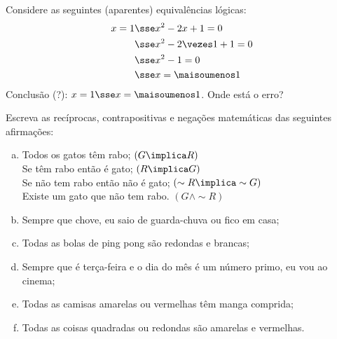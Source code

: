 \begin{exercise}
  Considere as seguintes (aparentes) equivalências lógicas:
  \begin{align*}
    x = 1 & \sse x^2 -2x +1 = 0         \\
          & \sse x^2 -2 \vezes 1 +1 = 0 \\
          & \sse x^2 - 1 = 0            \\
          & \sse x = \maisoumenos 1
  \end{align*}
  Conclusão (?): $x = 1 \sse x = \maisoumenos 1$. Onde está o erro?
\end{exercise}

\begin{exercise}
  \label{exe:escrever-reciprocas}
  Escreva as recíprocas, contrapositivas e negações matemáticas das seguintes afirmações:
  \begin{enumerate}[a)]
    \item Todos os gatos têm rabo; $\left(G \implica R \right)$\\
     Se têm rabo então é gato; $\left(R \implica G \right)$\\
     Se não tem rabo então não é gato; $\left(\sim R \implica \sim G \right)$\\
     Existe um gato que não tem rabo. $\left(G \land \sim R \right)$
    \item Sempre que chove, eu saio de guarda-chuva ou fico em casa;
    \item Todas as bolas de ping pong são redondas e brancas;
    \item Sempre que é terça-feira e o dia do mês é um número primo, eu vou ao cinema;
    \item Todas as camisas amarelas ou vermelhas têm manga comprida;
    \item Todas as coisas quadradas ou redondas são amarelas e
    vermelhas.
  \end{enumerate}
\end{exercise}


